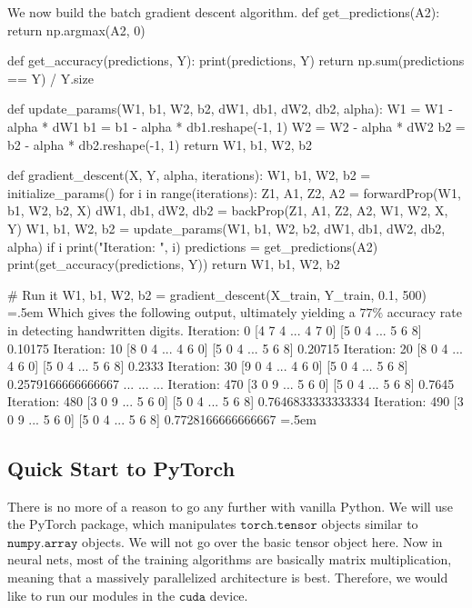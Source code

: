 \documentclass{article}
\newenvironment{cverbatim}
 {\SaveVerbatim{cverb}}
 {\endSaveVerbatim
  \flushleft\fboxrule=0pt\fboxsep=.5em
  \colorbox{cverbbg}{%
    \makebox[\dimexpr\linewidth-2\fboxsep][l]{\BUseVerbatim{cverb}}%
  }
  \endflushleft
}
\theoremstyle{definition}
\theoremstyle{remark}
\theoremstyle{definition}
\begin{document}
We now build the batch gradient descent algorithm. 
\begin{cverbatim}
def get_predictions(A2):
    return np.argmax(A2, 0)

def get_accuracy(predictions, Y):
    print(predictions, Y)
    return np.sum(predictions == Y) / Y.size

def update_params(W1, b1, W2, b2, dW1, db1, dW2, db2, alpha):
    W1 = W1 - alpha * dW1
    b1 = b1 - alpha * db1.reshape(-1, 1)    
    W2 = W2 - alpha * dW2  
    b2 = b2 - alpha * db2.reshape(-1, 1)       
    return W1, b1, W2, b2

def gradient_descent(X, Y, alpha, iterations): 
    W1, b1, W2, b2 = initialize_params()
    for i in range(iterations):
        Z1, A1, Z2, A2 = forwardProp(W1, b1, W2, b2, X)
        dW1, db1, dW2, db2 = backProp(Z1, A1, Z2, A2, W1, W2, X, Y)
        W1, b1, W2, b2 = update_params(W1, b1, W2, b2, dW1, db1, dW2, db2, alpha)
        if i %
            print("Iteration: ", i)
            predictions = get_predictions(A2)
            print(get_accuracy(predictions, Y))
    return W1, b1, W2, b2

# Run it
W1, b1, W2, b2 = gradient_descent(X_train, Y_train, 0.1, 500)
\end{cverbatim}
Which gives the following output, ultimately yielding a $77\%$ accuracy rate in detecting handwritten digits. 
\begin{cverbatim}
Iteration:  0
[4 7 4 ... 4 7 0] [5 0 4 ... 5 6 8]
0.10175
Iteration:  10
[8 0 4 ... 4 6 0] [5 0 4 ... 5 6 8]
0.20715
Iteration:  20
[8 0 4 ... 4 6 0] [5 0 4 ... 5 6 8]
0.2333
Iteration:  30
[9 0 4 ... 4 6 0] [5 0 4 ... 5 6 8]
0.2579166666666667
...
...
...
Iteration:  470
[3 0 9 ... 5 6 0] [5 0 4 ... 5 6 8]
0.7645
Iteration:  480
[3 0 9 ... 5 6 0] [5 0 4 ... 5 6 8]
0.7646833333333334
Iteration:  490
[3 0 9 ... 5 6 0] [5 0 4 ... 5 6 8]
0.7728166666666667
\end{cverbatim}


\subsection{Quick Start to PyTorch}

There is no more of a reason to go any further with vanilla Python. We will use the PyTorch package, which manipulates $\texttt{torch.tensor}$ objects similar to $\texttt{numpy.array}$ objects. We will not go over the basic tensor object here. Now in neural nets, most of the training algorithms are basically matrix multiplication, meaning that a massively parallelized architecture is best. Therefore, we would like to run our modules in the $\texttt{cuda}$ device. 
\end{document}
